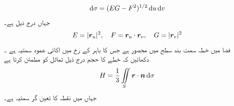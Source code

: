 \[\dif\sigma=(EG-F^2)^{1/2}\dif u\dif v\]
جہاں درج ذیل ہے۔
\[E=|{{\boldsymbol{r}}}_u|^2,\quad F={{\boldsymbol{r}}}_u\cdot{\ensuremath{{\boldsymbol{r}}}}_v,\quad G=|{{\boldsymbol{r}}}_v|^2\]
 فضا میں    خطہ سمت بند سطح    میں محصور ہے جس  کا باہر  کے  رخ  میں  اکائی عمود سمتیہ  ہے ۔ دکھائیں کہ خطے کا حجم  درج ذیل تماثل کو مطمئن کرتا ہے
\[H=\frac{1}{3}\iint\limits_S\kvec{r}\cdot\an\dif\sigma\]
جہاں  میں نقطہ  کا تعین گر سمتیہ  ہے۔

